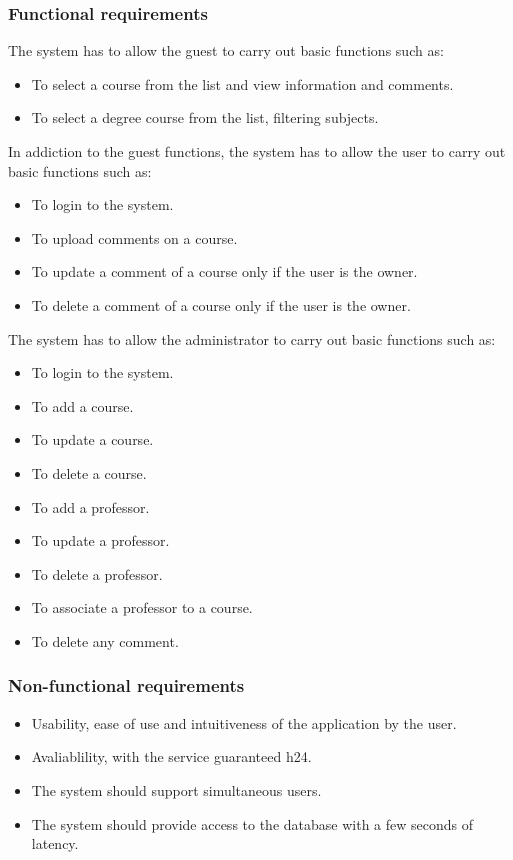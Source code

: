 \documentclass[a4paper]{article}
\begin{document}
\subsubsection{Functional requirements}
The system has to allow the guest to carry out basic functions such as:
\begin{itemize}
\item To select a course from the list and view information and comments.
\item To select a degree course from the list, filtering subjects.
\end{itemize}
In addiction to the guest functions, the system has to allow the user to carry out basic functions such as:
\begin{itemize}
\item To login to the system.
\item To upload comments on a course.
\item To update a comment of a course only if the user is the owner.
\item To delete a comment of a course only if the user is the owner.
\end{itemize}
\vspace{2mm}
The system has to allow the administrator to carry out basic functions such as:
\begin{itemize}
\item To login to the system.
\item To add a course.
\item To update a course.
\item To delete a course.
\item To add a professor.
\item To update a professor.
\item To delete a professor.
\item To associate a professor to a course.
\item To delete any comment.
\end{itemize}
\vspace{2mm}

\subsubsection{Non-functional requirements}
\begin{itemize}
\item Usability, ease of use and intuitiveness of the application by the user.
\item Avaliablility, with the service guaranteed h24.
\item The system should support simultaneous users.
\item The system should provide access to the database with a few seconds of latency.
\end{itemize}
\end{document}
